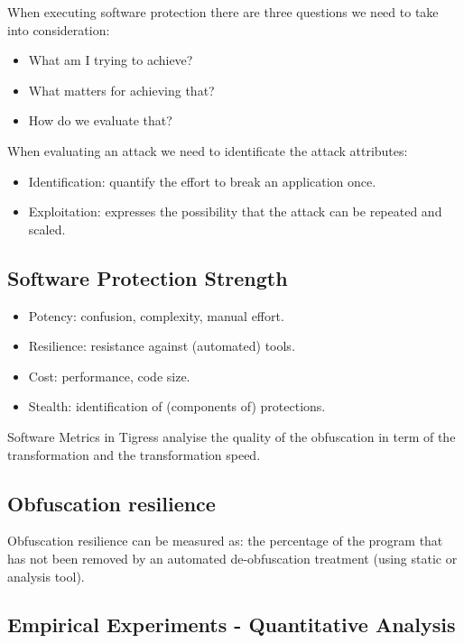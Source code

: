 When executing software protection there are three questions we need to take into consideration:
\begin{itemize}
    \item What am I trying to achieve?
    \item What matters for achieving that?
    \item How do we evaluate that? 
\end{itemize}

When evaluating an attack we need to identificate the attack attributes: 

\begin{itemize}
    \item Identification: quantify the effort to break an application once.
    \item Exploitation: expresses the possibility that the attack can be repeated and scaled.
\end{itemize}

\subsection{Software Protection Strength}
\begin{itemize}
    \item Potency: confusion, complexity, manual effort.
    \item Resilience: resistance against (automated) tools.
    \item Cost: performance, code size.
    \item Stealth: identification of (components of) protections.
\end{itemize}

Software Metrics in Tigress analyise the quality of the obfuscation in term of the transformation and the transformation speed. 

\subsection{Obfuscation resilience}

Obfuscation resilience can be measured as: 
the percentage of the program that has not been removed by an automated de-obfuscation treatment (using static or analysis tool).

\subsection{Empirical Experiments - Quantitative Analysis}

